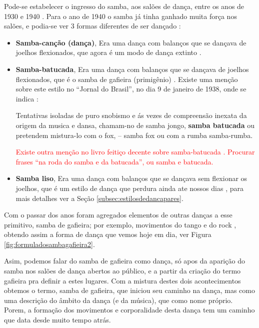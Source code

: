 Pode-se estabelecer o ingresso do samba, aos salões de dança, entre os anos de 1930 e 1940 \cite[pp. 140]{perna2002samba}.
Para o ano de 1940 o samba  já tinha ganhado muita força nos salões,
e podia-se ver 3 formas diferentes de ser dançado \cite[pp. 142-143]{perna2002samba}:
\begin{itemize}
\item \textbf{Samba-canção (dança)},
Era uma dança com balanços que se dançava de joelhos flexionados, 
que agora é um modo de dança extinto \cite[pp. 143]{perna2002samba}.

\item \textbf{Samba-batucada},
Era uma dança com balanços que se dançava de joelhos flexionados,
que é o samba de gafieira (primigênio) \cite[pp. 143]{perna2002samba}.
Existe uma menção sobre este estilo no ``Jornal do Brasil'', no dia 9 de janeiro de 1938,
onde se indica \cite[pp. 4]{musicasambavariasdef1}:
\begin{citando}%
Tentativas isoladas de puro 
snobismo e ás vezes de compreensão 
inexata da origem da 
musica e dansa, chamam-no de samba jongo, \textbf{samba batucada} ou
pretendem mistura-lo com o fox, -- samba fox ou com a rumba samba-rumba.
\end{citando}

\textcolor{red}{Existe outra menção no livro feitiço decente sobre samba-batucada \cite[pp. 111]{sandroni2001feitico}.}
\textcolor{red}{Procurar frases ``na roda do samba e da batucada'', ou samba e batucada.}

\item \textbf{Samba liso}, 
Era uma dança com balanços que se dançava sem flexionar os joelhos,
que é um estilo de dança que perdura ainda ate nossos dias \cite[pp. 143]{perna2002samba}, para mais detalhes ver a Seção \ref{subsec:estilosdedancapares}.
\end{itemize}

Com o passar dos anos foram agregados elementos de outras danças a esse primitivo, samba de gafieira;
por exemplo, movimentos do tango e do rock \cite[pp. 142]{perna2002samba}, 
obtendo assim a forma de dança que vemos hoje em dia, ver Figura \ref{fig:formuladosambagafieira2}.

Asim, podemos falar do samba de gafieira como dança, só apos da aparição do samba nos
salões de dança abertos ao público, e a partir da criação do termo gafieira pra definir a estes lugares.
Com a mistura destes dois acontecimentos obtemos o termo, samba de gafieira,
que iniciou seu caminho na dança, mas como uma descrição do âmbito da dança (e da música), que como nome próprio.
Porem, a formação dos movimentos e corporalidade desta dança tem um caminho que data desde muito tempo atrás.


